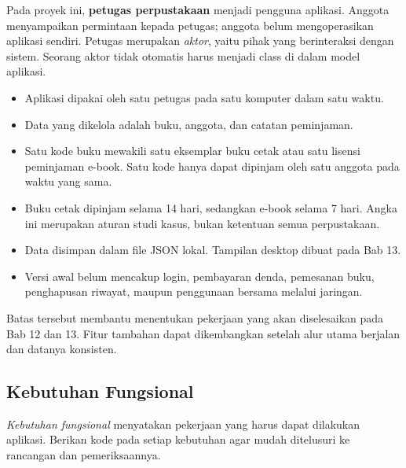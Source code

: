 Pada proyek ini, \textbf{petugas perpustakaan} menjadi pengguna aplikasi. Anggota menyampaikan permintaan kepada petugas; anggota belum mengoperasikan aplikasi sendiri. Petugas merupakan \emph{aktor}, yaitu pihak yang berinteraksi dengan sistem. Seorang aktor tidak otomatis harus menjadi class di dalam model aplikasi.

\begin{contoh}
\begin{itemize}
  \item Aplikasi dipakai oleh satu petugas pada satu komputer dalam satu waktu.
  \item Data yang dikelola adalah buku, anggota, dan catatan peminjaman.
  \item Satu kode buku mewakili satu eksemplar buku cetak atau satu lisensi peminjaman e-book. Satu kode hanya dapat dipinjam oleh satu anggota pada waktu yang sama.
  \item Buku cetak dipinjam selama 14 hari, sedangkan e-book selama 7 hari. Angka ini merupakan aturan studi kasus, bukan ketentuan semua perpustakaan.
  \item Data disimpan dalam file JSON lokal. Tampilan desktop dibuat pada Bab 13.
  \item Versi awal belum mencakup login, pembayaran denda, pemesanan buku, penghapusan riwayat, maupun penggunaan bersama melalui jaringan.
\end{itemize}
\end{contoh}

Batas tersebut membantu menentukan pekerjaan yang akan diselesaikan pada Bab 12 dan 13. Fitur tambahan dapat dikembangkan setelah alur utama berjalan dan datanya konsisten.

\subsection{Kebutuhan Fungsional}

\emph{Kebutuhan fungsional} menyatakan pekerjaan yang harus dapat dilakukan aplikasi. Berikan kode pada setiap kebutuhan agar mudah ditelusuri ke rancangan dan pemeriksaannya.

